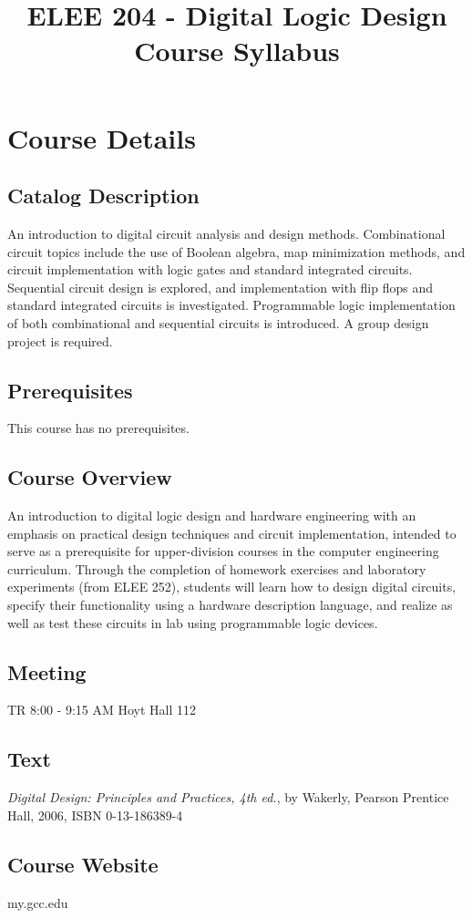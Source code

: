 \documentclass{article}
\title{ELEE 204 - Digital Logic Design\\Course Syllabus}
\date{}
\begin{document}
\maketitle
\thispagestyle{fancy}
\section{Course Details}
\subsection{Catalog Description}
An introduction to digital circuit analysis and design methods. Combinational circuit topics include the use of Boolean algebra, map minimization methods, and circuit implementation with logic gates and standard integrated circuits. Sequential circuit design is explored, and implementation with flip flops and standard integrated circuits is investigated. Programmable logic implementation of both combinational and sequential circuits is introduced.  A group design project is required.
\subsection{Prerequisites}
This course has no prerequisites.
\subsection{Course Overview}
An introduction to digital logic design and hardware engineering with an emphasis on practical design techniques and circuit implementation, intended to serve as a prerequisite for upper-division courses in the computer engineering curriculum.  Through the completion of homework exercises and laboratory experiments (from ELEE 252), students will learn how to design digital circuits, specify their functionality using a hardware description language, and realize as well as test these circuits in lab using programmable logic devices.
\subsection{Meeting}
TR 8:00 - 9:15 AM Hoyt Hall 112
\subsection{Text}
\emph{Digital Design: Principles and Practices, 4th ed.}, by Wakerly, Pearson Prentice Hall, 2006, ISBN 0-13-186389-4
\subsection{Course Website}
my.gcc.edu
\end{document}

